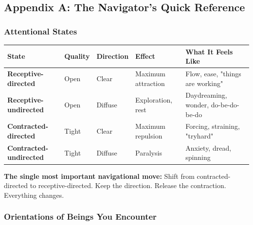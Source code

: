 \subsection*{Appendix A: The Navigator's Quick Reference}


\subsubsection*{Attentional States}



{\small
\begin{longtable}{>{\raggedright\arraybackslash}p{} >{\raggedright\arraybackslash}p{} >{\raggedright\arraybackslash}p{} >{\raggedright\arraybackslash}p{} >{\raggedright\arraybackslash}p{}}
\toprule
\textbf{State} & \textbf{Quality} & \textbf{Direction} & \textbf{Effect} & \textbf{What It Feels Like} \\
\midrule
\endhead
\textbf{Receptive-directed} & Open & Clear & Maximum attraction & Flow, ease, "things are working" \\
\textbf{Receptive-undirected} & Open & Diffuse & Exploration, rest & Daydreaming, wonder, do-be-do-be-do \\
\textbf{Contracted-directed} & Tight & Clear & Maximum repulsion & Forcing, straining, "tryhard" \\
\textbf{Contracted-undirected} & Tight & Diffuse & Paralysis & Anxiety, dread, spinning \\
\bottomrule
\end{longtable}
}



\textbf{The single most important navigational move:} Shift from contracted-directed to receptive-directed. Keep the direction. Release the contraction. Everything changes.


\subsubsection*{Orientations of Beings You Encounter}



